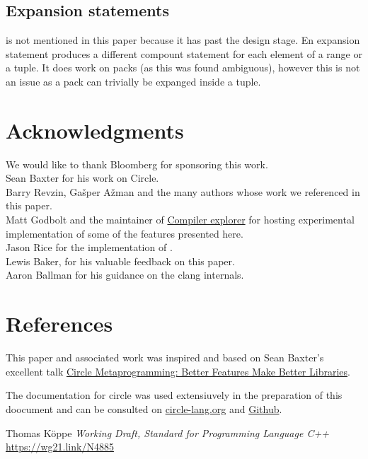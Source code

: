 \documentclass{wg21}
\begin{document}
\subsection{ Expansion statements}

 is not mentioned in this paper because it has past the design stage.
En expansion statement produces a different compount statement for each element of a range or a tuple.
It does work on packs (as this was found ambiguous), however this is not an issue as a pack can trivially be expanged inside a tuple.


\section{Acknowledgments}

We would like to thank Bloomberg for sponsoring this work.\\

Sean Baxter for his work on Circle.\\

Barry Revzin, Gašper Ažman and the many authors whose work we referenced in this paper.\\

Matt Godbolt and the maintainer of \href{compiler-explorer.com}{Compiler explorer} for hosting experimental implementation of some of the features presented here.\\

Jason Rice for the implementation of .\\

Lewis Baker, for his valuable feedback on this paper.\\

Aaron Ballman for his guidance on the clang internals.

\section{References}

This paper and associated work was inspired and based on Sean Baxter's excellent talk
\href{https://www.youtube.com/watch?v=15j4bkipuAg}{Circle Metaprogramming: Better Features Make Better Libraries}.

The documentation for circle was used extensiuvely in the preparation of this doocument and can be consulted on \href{https://www.circle-lang.org/}{circle-lang.org}
and \href{https://github.com/seanbaxter/circle}{Github}.

\vspace{20mm}

\renewcommand{\section}[2]{}%



\begin{thebibliography}{9}

Thomas Köppe
\emph{Working Draft, Standard for Programming Language C++}\newline
\url{https://wg21.link/N4885}


\end{thebibliography}
\end{document}
